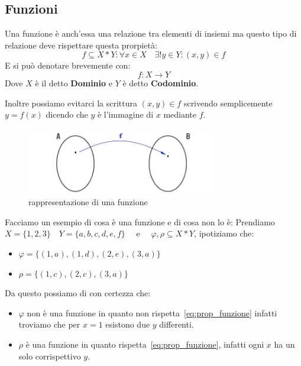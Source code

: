 \documentclass{article}
\theoremstyle{definition}
\begin{document}
\subsection{Funzioni}
Una funzione è anch'essa una relazione tra elementi di insiemi ma questo tipo di relazione deve rispettare questa prorpietà:
\begin{equation}\label{eq:prop_funzione}
        f \subseteq X*Y : \forall x \in X \quad \exists! y \in Y : (x,y) \in f 
\end{equation}
E si può denotare brevemente con:
\begin{equation*}
        f : X \to Y
\end{equation*}
Dove $ X $ è il detto \textbf{Dominio} e $ Y $ è detto \textbf{Codominio}. \par  
Inoltre possiamo evitarci la scrittura $ (x,y) \in f $ scrivendo semplicemente $ y = f(x) $ dicendo che $ y $ è l'immagine di $ x $ mediante $ f $. \par   

\begin{figure}[h]
        \centering
                \includegraphics[width=0.75\textwidth]{esempio_funzione.jpg}
        \caption{rappresentazione di una funzione}\label{fig:esempio_funzione}
\end{figure}
Facciamo un esempio di cosa è una funzione e di cosa non lo è: \newline
Prendiamo $ X = \{1,2,3\} \quad  Y = \{a,b,c,d,e,f\} \quad $  e $\quad  \varphi, \rho \subseteq X*Y$, ipotiziamo che:
\begin{itemize}
        \item $ \varphi = \{(1,a), (1,d), (2,e), (3,a)\} $ 
        \item $ \rho = \{(1,c), (2,c), (3,a)\} $ 
\end{itemize}

Da questo possiamo di con certezza che:
\begin{itemize}
        \item $ \varphi$ non è una funzione in quanto non rispetta~\ref{eq:prop_funzione} infatti troviamo che per $ x = 1 $ esistono due $ y $ differenti. 
        \item $ \rho $ è una funzione in quanto rispetta~\ref{eq:prop_funzione}, infatti ogni $ x $ ha un solo corrispettivo $ y $.     
\end{itemize}
\end{document}
